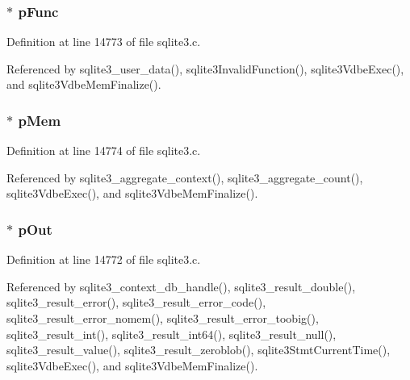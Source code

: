 \hypertarget{structsqlite3__context_a3859b9ebe9b2002c8ffb62f1a52e5c4d}{}
\subsubsection[{p\+Func}]{$\ast$ p\+Func}\label{structsqlite3__context_a3859b9ebe9b2002c8ffb62f1a52e5c4d}


Definition at line 14773 of file sqlite3.\+c.



Referenced by sqlite3\+\_\+user\+\_\+data(), sqlite3\+Invalid\+Function(), sqlite3\+Vdbe\+Exec(), and sqlite3\+Vdbe\+Mem\+Finalize().

\hypertarget{structsqlite3__context_a7635916f8de63cb13cfe0579469bb583}{}
\subsubsection[{p\+Mem}]{$\ast$ p\+Mem}\label{structsqlite3__context_a7635916f8de63cb13cfe0579469bb583}


Definition at line 14774 of file sqlite3.\+c.



Referenced by sqlite3\+\_\+aggregate\+\_\+context(), sqlite3\+\_\+aggregate\+\_\+count(), sqlite3\+Vdbe\+Exec(), and sqlite3\+Vdbe\+Mem\+Finalize().

\hypertarget{structsqlite3__context_ac4a03ce06815fb834cf607e3610c3023}{}
\subsubsection[{p\+Out}]{$\ast$ p\+Out}\label{structsqlite3__context_ac4a03ce06815fb834cf607e3610c3023}


Definition at line 14772 of file sqlite3.\+c.



Referenced by sqlite3\+\_\+context\+\_\+db\+\_\+handle(), sqlite3\+\_\+result\+\_\+double(), sqlite3\+\_\+result\+\_\+error(), sqlite3\+\_\+result\+\_\+error\+\_\+code(), sqlite3\+\_\+result\+\_\+error\+\_\+nomem(), sqlite3\+\_\+result\+\_\+error\+\_\+toobig(), sqlite3\+\_\+result\+\_\+int(), sqlite3\+\_\+result\+\_\+int64(), sqlite3\+\_\+result\+\_\+null(), sqlite3\+\_\+result\+\_\+value(), sqlite3\+\_\+result\+\_\+zeroblob(), sqlite3\+Stmt\+Current\+Time(), sqlite3\+Vdbe\+Exec(), and sqlite3\+Vdbe\+Mem\+Finalize().

